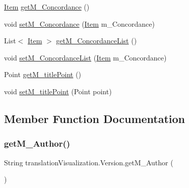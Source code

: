 \begin{DoxyCompactItemize}
\item 
\hyperlink{classtranslation_visualization_1_1_item}{Item} \hyperlink{classtranslation_visualization_1_1_version_a02ee5ec71b321d0f425b55c1bf60ade7}{get\+M\+\_\+\+Concordance} ()
\item 
void \hyperlink{classtranslation_visualization_1_1_version_a3e999218715e8099cb6d5de152b20ef4}{set\+M\+\_\+\+Concordance} (\hyperlink{classtranslation_visualization_1_1_item}{Item} m\+\_\+\+Concordance)
\item 
List$<$ \hyperlink{classtranslation_visualization_1_1_item}{Item} $>$ \hyperlink{classtranslation_visualization_1_1_version_a4f18e386beff290d788e426414f62e27}{get\+M\+\_\+\+Concordance\+List} ()
\item 
void \hyperlink{classtranslation_visualization_1_1_version_a5a59a5e66eed9a1087c7a40d8f1f3e9f}{set\+M\+\_\+\+Concordance\+List} (\hyperlink{classtranslation_visualization_1_1_item}{Item} m\+\_\+\+Concordance)
\item 
Point \hyperlink{classtranslation_visualization_1_1_version_a0ff3f88a5e95c7dc3a41dce9f45b7bd6}{get\+M\+\_\+title\+Point} ()
\item 
void \hyperlink{classtranslation_visualization_1_1_version_a90f774c31c131b82dcb57ad1f73d1456}{set\+M\+\_\+title\+Point} (Point point)
\end{DoxyCompactItemize}


\subsection{Member Function Documentation}
\mbox{\label{classtranslation_visualization_1_1_version_a122a700e0290511d0fb75bbc16124e3c}} 
\subsubsection{\texorpdfstring{get\+M\+\_\+\+Author()}{getM\_Author()}}
{\footnotesize\ttfamily String translation\+Visualization.\+Version.\+get\+M\+\_\+\+Author (\begin{DoxyParamCaption}{ }\end{DoxyParamCaption})\hspace{0.3cm}{\ttfamily [inline]}}

